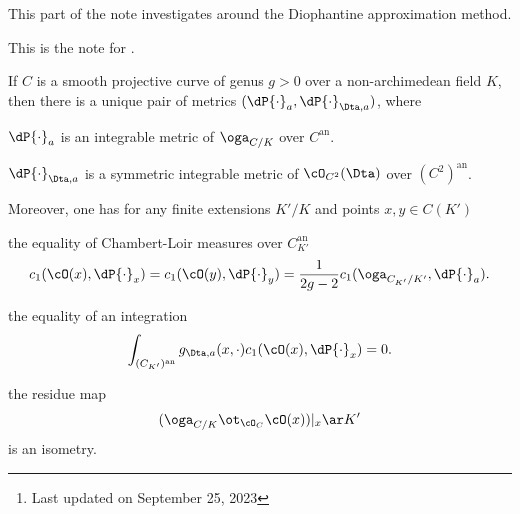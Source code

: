 \documentclass[a4paper, twoside]{article}
\title{\tbf{Diophantine approximation}}
\author{\tbf{Notes} by Cong Wen, 09/2023}
\date{}
\begin{document}
\maketitle
\thispagestyle{empty}
\begin{abstract}
	This is my self-use notes\footnote{Last updated on September 25, 2023} to understand some topics in .

	Please reach out if you find anything incorrect.
\end{abstract}
\tableofcontents





This part of the note investigates \cite{Vojta1989Mordell,Faltings1991,Bombieri1990} around the Diophantine approximation method.




This is the note for \cite{Yuan2021Bigness}.



\begin{thm}[Theorem~A.1]
	If $C$ is a smooth projective curve of genus $g>0$ over a non-archimedean field $K$, then there is a unique pair of metrics $(\dP{\cdot}_{a},\dP{\cdot}_{\Dta,a})$, where
	\begin{enr}
		\item $\dP{\cdot}_{a}$ is an integrable metric of $\oga_{C/K}$ over $C^{\mathrm{an}}$.
		\item $\dP{\cdot}_{\Dta,a}$ is a symmetric integrable metric of $\cO_{C^{2}}(\Dta)$ over $(C^{2})^{\mathrm{an}}$.
	\end{enr}
	Moreover, one has for any finite extensions $K'/K$ and points $x,y\in C(K')$
	\begin{enr}
		\item the equality of Chambert-Loir measures over $C_{K'}^{\mathrm{an}}$
		\[
			c_{1}(\cO(x),\dP{\cdot}_{x})=c_{1}(\cO(y),\dP{\cdot}_{y})=\frac{1}{2g-2}c_{1}(\oga_{C_{K'}/K'},\dP{\cdot}_{a}).
		\]
		\item the equality of an integration
		\[
			\int_{(C_{K'})^{\mathrm{an}}}g_{\Dta,a}(x,\cdot)c_{1}(\cO(x),\dP{\cdot}_{x})=0.
		\]
		\item the residue map
		\[
			(\oga_{C/K}\ot_{\cO_{C}}\cO(x))|_{x}\ar K'
		\]
		is an isometry.
	\end{enr}
\end{thm}
\end{document}
